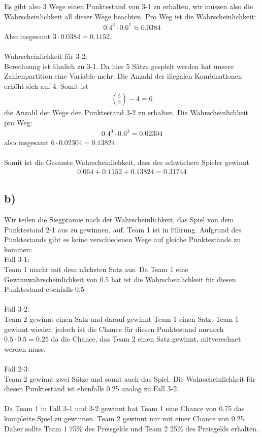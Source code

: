 Es gibt also 3 Wege einen Punktestand von 3-1 zu erhalten, wir müssen also die Wahrscheinlichkeit all dieser Wege beachten. Pro Weg ist die Wahrscheinlichkeit:
\begin{align*}
0.4^3 \cdot 0.6^1 \approx 0.0384
\end{align*}
Also insgesamt $ 3 \cdot 0.0384 = 0.1152$.\\\\
Wahrscheinlichkeit für 3-2:\\
Berechnung ist ähnlich zu 3-1. Da hier 5 Sätze gespielt werden hat unsere Zahlenpartition eine Variable mehr. Die Anzahl der illegalen Kombinationen erhöht sich auf 4. Somit ist
\begin{align*}
  \binom{5}{3} - 4 = 6
\end{align*}
die Anzahl der Wege den Punktestand 3-2 zu erhalten. Die Wahrscheinlichkeit pro Weg:
\begin{align*}
  0.4^3 \cdot 0.6^2 = 0.02304
\end{align*}
also insgesamt $ 6\cdot 0.02304 = 0.13824 $.\\\\
Somit ist die Gesamte Wahrscheinlichkeit, dass der schwächere Spieler gewinnt
\begin{align*}
  0.064 + 0.1152 + 0.13824 =  0.31744
\end{align*}
\subsection*{b)}
Wir teilen die Siegprämie nach der Wahrscheinlichkeit, das Spiel von dem Punktestand 2-1 aus zu gewinnen, auf. Team 1 ist in führung. Aufgrund des Punktestands gibt es keine verschiedenen Wege auf gleiche Punktestände zu kommen: 
\pagebreak
\\ Fall 3-1:\\
Team 1 macht mit dem nächsten Satz aus. Da Team 1 eine Gewinnwahrscheinlichkeit von 0.5 hat ist die Wahrscheinlichkeit für diesen Punktestand ebenfalls 0.5 \\\\
Fall 3-2:\\
Team 2 gewinnt einen Satz und darauf gewinnt Team 1 einen Satz. Team 1 gewinnt wieder, jedoch ist die Chance für diesen Punktestand nurnoch $ 0.5\cdot 0.5 = 0.25 $ da die Chance, das Team 2 einen Satz gewinnt, mitverechnet werden muss.\\\\
Fall 2-3:\\
Team 2 gewinnt zwei Sätze und somit auch das Spiel. Die Wahrscheinlichkeit für diesen Punktestand ist ebenfalls 0.25 analog zu Fall 3-2.\\\\
Da Team 1 in Fall 3-1 und 3-2 gewinnt hat Team 1 eine Chance von 0.75 das komplette Spiel zu gewinnen. Team 2 gewinnt nur mit einer Chance von 0.25. Daher sollte Team 1 75\% des Preisgelds und Team 2 25\% des Preisgelds erhalten.